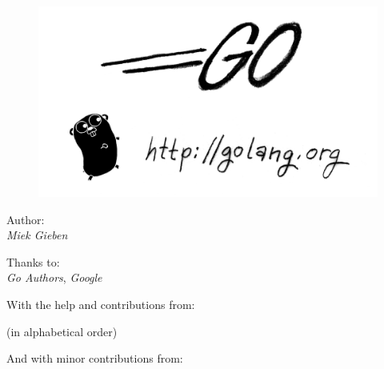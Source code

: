\documentclass[a4paper,twoside,openleft]{blocksbook}
\begin{document}
\thispagestyle{empty}
\newcommand{\version}{1.0}
\strictpagecheck

\begin{center}
\\
\end{center}
\vspace*{2cm}
\begin{figure}[h!]
\begin{center}
    \includegraphics[scale=0.65]{fig/bumper-inverse.png}
\end{center}
\end{figure}
\vspace*{0.02\stockheight}
\begin{minipage}{0.4\textwidth}
\begin{flushleft} \large
\hspace*{2,0cm}Author:\\
\hspace*{2.0cm}\emph{Miek Gieben}\\
\vfill
\end{flushleft}
\end{minipage}
\hspace{5mm}
\begin{minipage}{0.4\textwidth}
\begin{flushright} \large
Thanks to:\\
\emph{Go Authors}, \emph{Google}\\
\vfill
\end{flushright}
\end{minipage}
\vspace*{0.5cm}
\begin{center}
With the help and contributions from: 

({\small in alphabetical order})



And with minor contributions from:


\end{center}
\end{document}
